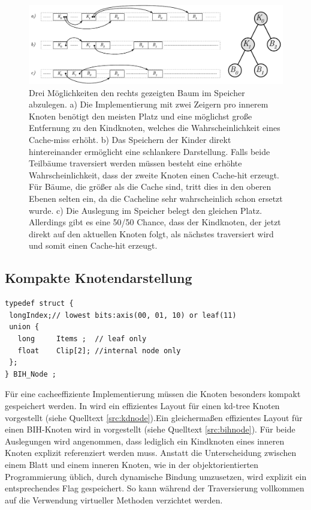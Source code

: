 \begin{figure}\centering
\includegraphics[width=1.0\textwidth]{images/memlayout.pdf} 
\caption[Speicherauslegung für binären Baum]{Drei Möglichkeiten den rechts gezeigten Baum im Speicher abzulegen. a) Die Implementierung mit zwei Zeigern pro innerem Knoten benötigt den meisten Platz und eine möglichst große Entfernung zu den Kindknoten, welches die Wahrscheinlichkeit eines Cache-miss erhöht. b) Das Speichern der Kinder direkt hintereinander ermöglicht eine schlankere Darstellung. Falls beide Teilbäume traversiert werden müssen besteht eine erhöhte Wahrscheinlichkeit, dass der zweite Knoten einen Cache-hit erzeugt. Für Bäume, die größer als die Cache sind, tritt dies in den oberen Ebenen selten ein, da die Cacheline sehr wahrscheinlich schon ersetzt wurde. c) Die Auslegung im Speicher belegt den gleichen Platz. Allerdings gibt es eine 50/50 Chance, dass der Kindknoten, der jetzt direkt auf den aktuellen Knoten folgt, als nächstes traversiert wird und somit einen Cache-hit erzeugt.}
\label{fig:memlayout}
\end{figure}

\subsection{Kompakte Knotendarstellung}

\begin{lstlisting}[belowcaptionskip=8pt,float,mathescape=true,caption={[Kompakte Speicherauslegung eines Bounding Intervall Hierarchy Knotens]BIH Knoten wie durch Waechter beschrieben. Belegt auf einer 32Bit Archtiktektur lediglich 12Byte entspr. 16Byte auf 64Bit Hardware},label=src:bihnode]
typedef struct {
 longIndex;// lowest bits:axis(00, 01, 10) or leaf(11)
 union {
   long     Items ;  // leaf only
   float    Clip[2]; //internal node only
 };
} BIH_Node ;
\end{lstlisting}

Für eine cacheeffiziente Implementierung müssen die Knoten besonders kompakt gespeichert werden. In \cite{Benthin06} wird ein effizientes Layout für einen kd-tree Knoten vorgestellt (siehe Quelltext \ref{src:kdnode}).Ein gleichermaßen effizientes Layout für einen BIH-Knoten wird in \cite{BIH06} vorgestellt (siehe Quelltext \ref{src:bihnode}). Für beide Auslegungen wird angenommen, dass lediglich ein Kindknoten eines inneren Knoten explizit referenziert werden muss. Anstatt die Unterscheidung zwischen einem Blatt und einem inneren Knoten, wie in der objektorientierten Programmierung üblich, durch dynamische Bindung umzusetzen, wird explizit ein entsprechendes Flag gespeichert. So kann während der Traversierung vollkommen auf die Verwendung virtueller Methoden verzichtet werden.

